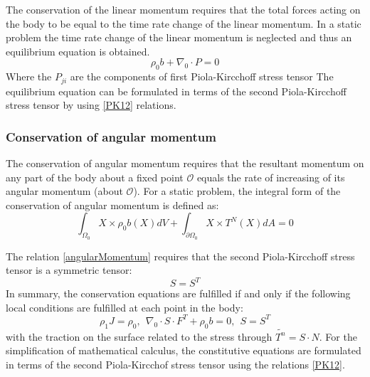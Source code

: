 The conservation of the linear momentum requires that the total forces acting on the body to be equal to the time rate change of the linear momentum. In a static problem the time rate change of the linear momentum is neglected and thus an equilibrium equation is obtained.
\begin{equation}
\rho_0 b+\nabla_0 \cdot P  = 0
\end{equation}
Where the $P_{ji}$ are the components of first Piola-Kircchoff stress tensor
The equilibrium equation can be formulated in terms of the second Piola-Kircchoff stress tensor by using \ref{PK12} relations.
\subsubsection*{Conservation of angular momentum}
The conservation of angular momentum requires that the resultant momentum on any part of the body about a fixed point $\mathcal{O}$ equals the rate of increasing of its angular momentum (about $\mathcal{O}$). For a static problem, the integral form of the conservation of angular momentum is defined as:
\begin{equation}
\label{angularMomentum}
\int_{\Omega_0} X \times \rho_0 b(X)dV + \int_{\partial \Omega_0} X \times  T^N(X)dA = 0
\end{equation}

The relation \ref{angularMomentum} requires that the second Piola-Kircchoff stress tensor is a symmetric tensor:
\begin{equation}
S = S^T
\end{equation}
In summary, the conservation equations are fulfilled if and only if the following local conditions are fulfilled at each point in the body:
\begin{equation}
\rho_1 J = \rho_0, \ \ \nabla_0 \cdot S \cdot F^T + \rho_0 b =0, \ \ S=S^T 
\end{equation}
with the traction on the surface related to the stress through $\tilde{T^n} = S \cdot N$.
 For the simplification of mathematical calculus, the constitutive equations are formulated in terms of the second Piola-Kircchof stress tensor using the relations \ref{PK12}.

